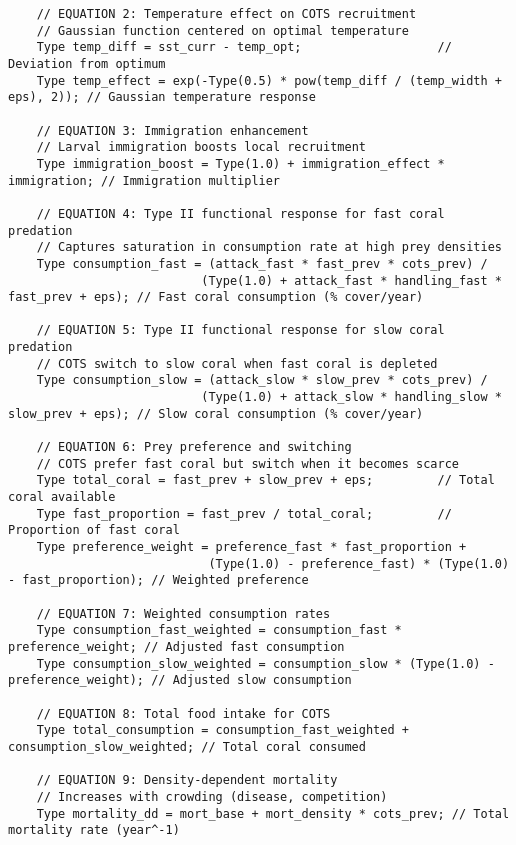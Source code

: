 \begin{lstlisting}
    // EQUATION 2: Temperature effect on COTS recruitment
    // Gaussian function centered on optimal temperature
    Type temp_diff = sst_curr - temp_opt;                   // Deviation from optimum
    Type temp_effect = exp(-Type(0.5) * pow(temp_diff / (temp_width + eps), 2)); // Gaussian temperature response
    
    // EQUATION 3: Immigration enhancement
    // Larval immigration boosts local recruitment
    Type immigration_boost = Type(1.0) + immigration_effect * immigration; // Immigration multiplier
    
    // EQUATION 4: Type II functional response for fast coral predation
    // Captures saturation in consumption rate at high prey densities
    Type consumption_fast = (attack_fast * fast_prev * cots_prev) / 
                           (Type(1.0) + attack_fast * handling_fast * fast_prev + eps); // Fast coral consumption (% cover/year)
    
    // EQUATION 5: Type II functional response for slow coral predation
    // COTS switch to slow coral when fast coral is depleted
    Type consumption_slow = (attack_slow * slow_prev * cots_prev) / 
                           (Type(1.0) + attack_slow * handling_slow * slow_prev + eps); // Slow coral consumption (% cover/year)
    
    // EQUATION 6: Prey preference and switching
    // COTS prefer fast coral but switch when it becomes scarce
    Type total_coral = fast_prev + slow_prev + eps;         // Total coral available
    Type fast_proportion = fast_prev / total_coral;         // Proportion of fast coral
    Type preference_weight = preference_fast * fast_proportion + 
                            (Type(1.0) - preference_fast) * (Type(1.0) - fast_proportion); // Weighted preference
    
    // EQUATION 7: Weighted consumption rates
    Type consumption_fast_weighted = consumption_fast * preference_weight; // Adjusted fast consumption
    Type consumption_slow_weighted = consumption_slow * (Type(1.0) - preference_weight); // Adjusted slow consumption
    
    // EQUATION 8: Total food intake for COTS
    Type total_consumption = consumption_fast_weighted + consumption_slow_weighted; // Total coral consumed
    
    // EQUATION 9: Density-dependent mortality
    // Increases with crowding (disease, competition)
    Type mortality_dd = mort_base + mort_density * cots_prev; // Total mortality rate (year^-1)
    

\end{lstlisting}
